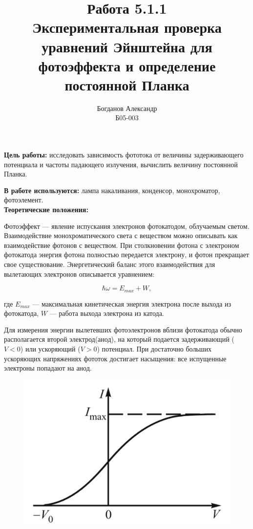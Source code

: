 \documentclass[a4paper, 12pt]{article}%
\author{Богданов Александр \\
	Б05-003}
\title{\textbf{Работа 5.1.1 \\ 
		Экспериментальная проверка уравнений Эйнштейна для фотоэффекта и определение постоянной Планка}}
\begin{document}
\maketitle

\textbf{Цель работы:} исследовать зависимость фототока от величины задерживающего потенциала и частоты падающего излучения,  вычислить величину постоянной Планка.

\textbf{В работе используются:} лампа накаливания,  конденсор,  монохроматор,  фотоэлемент. 
\\

\textbf{Теоретические положения:}\\\par

	Фотоэффект --- явление испускания электронов фотокатодом,  облучаемым светом. Взаимодействие монохроматического света с веществом можно описывать как взаимодействие фотонов с веществом.  При столкновении фотона с электроном фотокатода энергия фотона полностью передается электрону,  и фотон прекращает свое существование. Энергетический баланс этого взаимодействия для вылетающих электронов описывается уравнением:
	
\[\hbar \omega = E_{max} + W, \]
		
где $ E_{max} $ ---  максимальная кинетическая энергия электрона после выхода из фотокатода,  $W$ --- работа выхода электрона из катода.  
	
	Для измерения энергии вылетевших фотоэлектронов вблизи фотокатода обычно располагается второй электрод(анод),  на который подается задерживающий ($V < 0$) или ускоряющий ($V > 0$) потенциал.  При достаточно больших ускоряющих напряжениях фототок достигает насыщения: все испущенные электроны попадают на анод.

	\begin{figure}[h!]
	    \centering
		\includegraphics[scale=0.2]{График_1.PNG}
	\end{figure}
	
\end{document}
